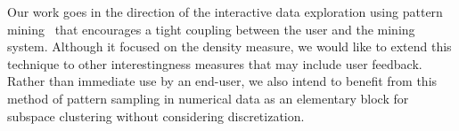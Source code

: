 \documentclass[twoside,leqno,twocolumn]{article}
\begin{document}
Our work goes in the direction of the interactive data exploration using pattern mining~\cite{GS17} that encourages a tight coupling between the user and the mining system. Although it focused on the density measure, we would like to extend this technique to other interestingness measures that may include user feedback. Rather than immediate use by an end-user, we also intend to benefit from this method of pattern sampling in numerical data as an elementary block for subspace clustering \cite{kriegel2009clustering} without considering discretization.


{\small

}
\end{document}
